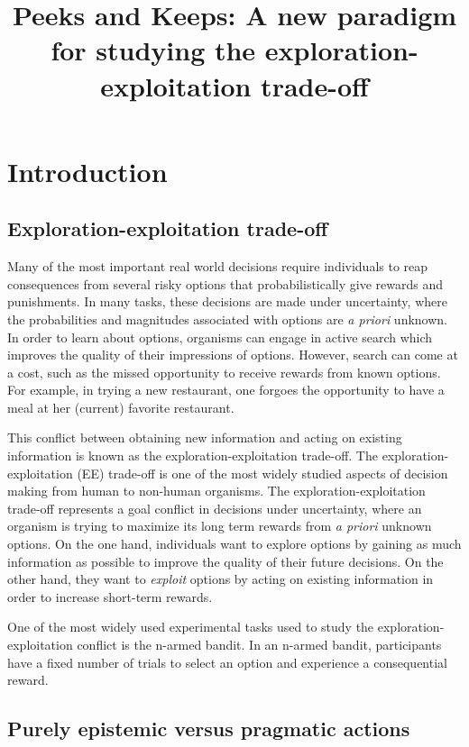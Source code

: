 \documentclass[a4paper,doc,natbib,floatsintext]{apa6}\usepackage[]{graphicx}\usepackage[]{color}
\title{Peeks and Keeps: A new paradigm for studying the exploration-exploitation trade-off}
\begin{document}
\maketitle

\section*{Introduction}



\subsection{Exploration-exploitation trade-off}

Many of the most important real world decisions require individuals to reap consequences from several risky options that probabilistically give rewards and punishments. In many tasks, these decisions are made under uncertainty, where the probabilities and magnitudes associated with options are \textit{a priori} unknown. In order to learn about options, organisms can engage in active search which improves the quality of their impressions of options. However, search can come at a cost, such as the missed opportunity to receive rewards from known options. For example, in trying a new restaurant, one forgoes the opportunity to have a meal at her (current) favorite restaurant.

This conflict between obtaining new information and acting on existing information is known as the exploration-exploitation trade-off. The exploration-exploitation (EE) trade-off is one of the most widely studied aspects of decision making from human to non-human organisms. The exploration-exploitation trade-off represents a goal conflict in decisions under uncertainty, where an organism is trying to maximize its long term rewards from \textit{a priori} unknown options. On the one hand, individuals want to explore options by gaining as much information as possible to improve the quality of their future decisions. On the other hand, they want to \textit{exploit} options by acting on existing information in order to increase short-term rewards.

One of the most widely used experimental tasks used to study the exploration-exploitation conflict is the n-armed bandit. In an n-armed bandit, participants have a fixed number of trials to select an option and experience a consequential reward.




\subsection{Purely epistemic versus pragmatic actions}
\end{document}
